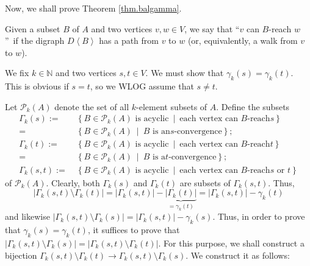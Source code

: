 \documentclass[numbers=enddot,12pt,final,onecolumn,notitlepage]{scrartcl}%
\theoremstyle{definition}
\theoremstyle{plainsl}
\begin{document}
Now, we shall prove Theorem \ref{thm.balgamma}.

Given a subset $B$ of $A$ and two vertices $v,w\in V$, we say that
\textquotedblleft$v$ can $B$-reach $w$\textquotedblright\ if the digraph
$D\left\langle B\right\rangle $ has a path from $v$ to $w$ (or, equivalently,
a walk from $v$ to $w$).

We fix $k\in\mathbb{N}$ and two vertices $s,t\in V$. We must show that
$\gamma_{k}\left(  s\right)  =\gamma_{k}\left(  t\right)  $. This is obvious
if $s=t$, so we WLOG assume that $s\neq t$.

Let $\mathcal{P}_{k}\left(  A\right)  $ denote the set of all $k$-element
subsets of $A$. Define the subsets
\begin{align*}
\Gamma_{k}\left(  s\right)  :=  &  \ \left\{  B\in\mathcal{P}_{k}\left(
A\right)  \text{ is acyclic}\ \mid\ \text{each vertex can }B\text{-reach
}s\right\} \\
=  &  \ \left\{  B\in\mathcal{P}_{k}\left(  A\right)  \ \mid\ B\text{ is an
}s\text{-convergence}\right\}  ;\\
\Gamma_{k}\left(  t\right)  :=  &  \ \left\{  B\in\mathcal{P}_{k}\left(
A\right)  \text{ is acyclic}\ \mid\ \text{each vertex can }B\text{-reach
}t\right\} \\
=  &  \ \left\{  B\in\mathcal{P}_{k}\left(  A\right)  \ \mid\ B\text{ is a
}t\text{-convergence}\right\}  ;\\
\Gamma_{k}\left(  s,t\right)  :=  &  \ \left\{  B\in\mathcal{P}_{k}\left(
A\right)  \text{ is acyclic}\ \mid\ \text{each vertex can }B\text{-reach
}s\text{ or }t\right\}
\end{align*}
of $\mathcal{P}_{k}\left(  A\right)  $. Clearly, both $\Gamma_{k}\left(
s\right)  $ and $\Gamma_{k}\left(  t\right)  $ are subsets of $\Gamma
_{k}\left(  s,t\right)  $. Thus,
\[
\left\vert \Gamma_{k}\left(  s,t\right)  \setminus\Gamma_{k}\left(  t\right)
\right\vert =\left\vert \Gamma_{k}\left(  s,t\right)  \right\vert
-\underbrace{\left\vert \Gamma_{k}\left(  t\right)  \right\vert }_{=\gamma
_{k}\left(  t\right)  }=\left\vert \Gamma_{k}\left(  s,t\right)  \right\vert
-\gamma_{k}\left(  t\right)
\]
and likewise $\left\vert \Gamma_{k}\left(  s,t\right)  \setminus\Gamma
_{k}\left(  s\right)  \right\vert =\left\vert \Gamma_{k}\left(  s,t\right)
\right\vert -\gamma_{k}\left(  s\right)  $. Thus, in order to prove that
$\gamma_{k}\left(  s\right)  =\gamma_{k}\left(  t\right)  $, it suffices to
prove that $\left\vert \Gamma_{k}\left(  s,t\right)  \setminus\Gamma
_{k}\left(  s\right)  \right\vert =\left\vert \Gamma_{k}\left(  s,t\right)
\setminus\Gamma_{k}\left(  t\right)  \right\vert $. For this purpose, we shall
construct a bijection $\Gamma_{k}\left(  s,t\right)  \setminus\Gamma
_{k}\left(  t\right)  \rightarrow\Gamma_{k}\left(  s,t\right)  \setminus
\Gamma_{k}\left(  s\right)  $. We construct it as follows:
\end{document}
